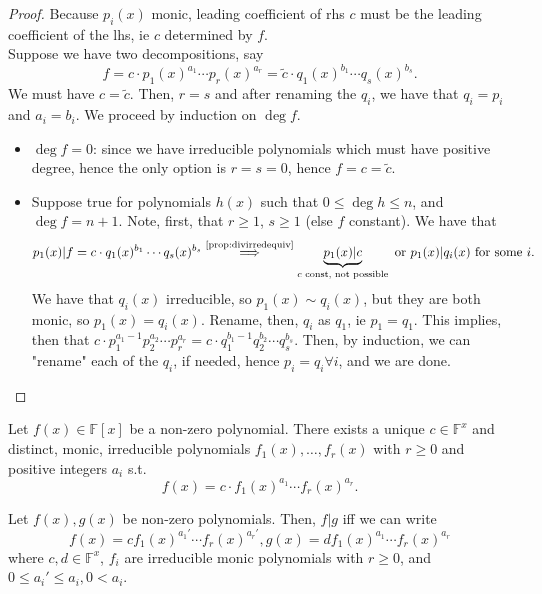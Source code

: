 \documentclass[12pt,oneside]{article}
\begin{document}
\begin{proof}
  Because $p_i(x)$ monic, leading coefficient of rhs $c$ must be the leading coefficient of the lhs, ie $c$ determined by $f$.\\
  Suppose we have two decompositions, say \[f = c \cdot p_1 (x)^{a_1}\cdots p_r(x)^{a_r} = \tilde{c} \cdot q_1(x)^{b_1} \cdots q_s(x)^{b_s}.\] We must have $c = \tilde{c}$. Then, $r = s$ and after renaming the $q_i$, we have that $q_i = p_i$ and $a_i = b_i$. We proceed by induction on $\deg f$. 
  \begin{itemize}
    \item $\deg f = 0$: since we have irreducible polynomials which must have positive degree\footnotemark, hence the only option is $r = s = 0$, hence $f = c = \tilde{c}$.
    \item Suppose true for polynomials $h(x)$ such that $0 \leq \deg h \leq n$, and $\deg f = n+1$. Note, first, that $r \geq 1$, $s \geq 1$ (else $f$ constant). We have that \[p_1(x) | f = c \cdot q_1(x)^{b_1} \cdots q_s (x)^{b_s} \overset{\text{\cref{prop:divirredequiv}}}{\implies} \underbrace{p_1(x) | c}_{c \text{ const, not possible}} \text{ or } p_1(x) | q_i(x) \text{ for some }i. \]
    We have that $q_i (x)$ irreducible, so $p_1(x) \sim q_i(x)$, but they are both monic, so $p_1(x) = q_i(x)$. Rename, then, $q_i$ as $q_1$, ie $p_1 = q_1$. This implies, then that $c\cdot p_1^{a_1 - 1}p_2^{a_2} \cdots p_r^{a_r} = c \cdot q_1^{b_1 - 1}q_2^{b_2} \cdots q_s^{b_s}$. Then, by induction, we can "rename" each of the $q_i$, if needed, hence $p_i = q_i \forall i$, and we are done.
  \end{itemize}
\end{proof}


\begin{theorem}\label{thm:uniquefactorizationpoly}
  Let $f(x) \in \mathbb{F}[x]$ be a non-zero polynomial. There exists a unique $c \in \mathbb{F}^x$ and distinct, monic, irreducible polynomials $f_1(x), \dots, f_r(x)$ with $r \geq 0$ and positive integers $a_i$ s.t. \[f(x) = c \cdot f_1(x)^{a_1} \cdots f_r(x)^{a_r}.\]
\end{theorem}

\begin{corollary}
  Let $f(x), g(x)$ be non-zero polynomials. Then, $f|g$ iff we can write \[
  f(x) = c f_1(x)^{a_1'}\cdots f_r(x)^{a_r'}, g(x) = d f_1(x)^{a_1}\cdots f_r(x)^{a_r}
  \]
  where $c,d \in \mathbb{F}^{x}$, $f_i$ are irreducible monic polynomials with $r \geq 0$, and $0 \leq a_i' \leq a_i, 0 < a_i$.
\end{corollary}
\end{document}
